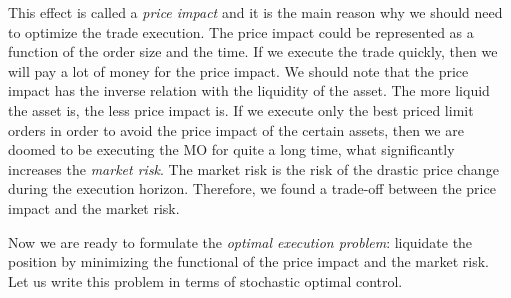     This effect is called a \emph{price impact} and it is the main reason why we should need to 
    optimize the trade execution. The price impact could be represented as a function of the order size and the time.
    If we execute the trade quickly, then we will pay a lot of money for the price impact. We should 
    note that the price impact has the inverse relation with the liquidity of the asset. The more liquid the asset is, the less price impact is.
    If we execute only the best priced limit orders in order to avoid the price impact of the certain assets, then we are 
    doomed to be executing the MO for quite a long time, what significantly increases the \emph{market risk}. The market 
    risk is the risk of the drastic price change during the execution horizon. Therefore, we found a trade-off between the 
    price impact and the market risk.
    
    Now we are ready to formulate the \emph{optimal execution problem}: liquidate the position by minimizing the functional of the price impact and the market risk. 
    Let us write this problem in terms of stochastic optimal control.

